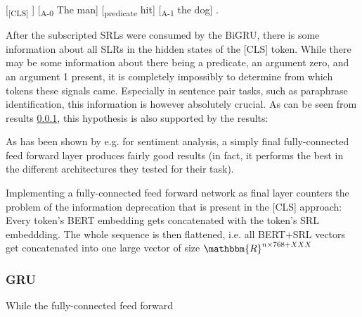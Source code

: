 [\textsubscript{[CLS]} ] [\textsubscript{A-0} The man] [\textsubscript{predicate} hit] [\textsubscript{A-1} the dog] .

After the subscripted SRLs were consumed by the BiGRU, there is some information about all
SLRs in the hidden states of the [CLS] token. While there may be some information about there
being a predicate, an argument zero, and an argument 1 present, it is completely impossibly
to determine from which tokens these signals came. Especially in sentence pair tasks, such
as paraphrase identification, this information is however absolutely crucial. As can be seen
from results \ref{}, this hypothesis is also supported by the results:



As has been shown by e.g. \cite{myagmar2019transferable} for sentiment analysis, a simply final
fully-connected feed forward layer produces fairly good results (in fact, it performs the best
in the different architectures they tested for their task).

Implementing a fully-connected feed forward network as final layer counters the problem of the
information deprecation that is present in the [CLS] approach: Every token's BERT embedding gets
concatenated with the token's SRL embeddding. The whole sequence is then flattened, i.e. all
BERT+SRL vectors get concatenated into one large vector of size $\mathbbm{R}^{n\times768+XXX}$


\subsubsection{GRU}

While the fully-connected feed forward


